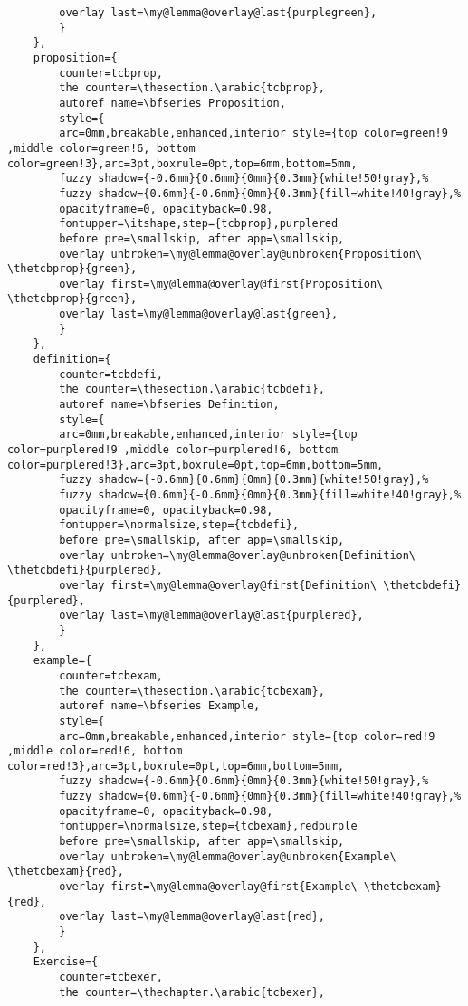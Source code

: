 \documentclass[lang=en,12pt]{beautybook}
\begin{document}
\begin{lstlisting}
        overlay last=\my@lemma@overlay@last{purplegreen},
        }
    },
    proposition={
        counter=tcbprop,
        the counter=\thesection.\arabic{tcbprop},
        autoref name=\bfseries Proposition,
        style={
        arc=0mm,breakable,enhanced,interior style={top color=green!9 ,middle color=green!6, bottom color=green!3},arc=3pt,boxrule=0pt,top=6mm,bottom=5mm,
        fuzzy shadow={-0.6mm}{0.6mm}{0mm}{0.3mm}{white!50!gray},% 
        fuzzy shadow={0.6mm}{-0.6mm}{0mm}{0.3mm}{fill=white!40!gray},%
        opacityframe=0, opacityback=0.98,
        fontupper=\itshape,step={tcbprop},purplered
        before pre=\smallskip, after app=\smallskip,
        overlay unbroken=\my@lemma@overlay@unbroken{Proposition\ \thetcbprop}{green},
        overlay first=\my@lemma@overlay@first{Proposition\ \thetcbprop}{green},
        overlay last=\my@lemma@overlay@last{green},
        }
    },
    definition={
        counter=tcbdefi,
        the counter=\thesection.\arabic{tcbdefi},
        autoref name=\bfseries Definition,
        style={
        arc=0mm,breakable,enhanced,interior style={top color=purplered!9 ,middle color=purplered!6, bottom color=purplered!3},arc=3pt,boxrule=0pt,top=6mm,bottom=5mm,
        fuzzy shadow={-0.6mm}{0.6mm}{0mm}{0.3mm}{white!50!gray},% 
        fuzzy shadow={0.6mm}{-0.6mm}{0mm}{0.3mm}{fill=white!40!gray},%
        opacityframe=0, opacityback=0.98,
        fontupper=\normalsize,step={tcbdefi},
        before pre=\smallskip, after app=\smallskip,
        overlay unbroken=\my@lemma@overlay@unbroken{Definition\ \thetcbdefi}{purplered},
        overlay first=\my@lemma@overlay@first{Definition\ \thetcbdefi}{purplered},
        overlay last=\my@lemma@overlay@last{purplered},
        }
    },
    example={
        counter=tcbexam,
        the counter=\thesection.\arabic{tcbexam},
        autoref name=\bfseries Example,
        style={
        arc=0mm,breakable,enhanced,interior style={top color=red!9 ,middle color=red!6, bottom color=red!3},arc=3pt,boxrule=0pt,top=6mm,bottom=5mm,
        fuzzy shadow={-0.6mm}{0.6mm}{0mm}{0.3mm}{white!50!gray},% 
        fuzzy shadow={0.6mm}{-0.6mm}{0mm}{0.3mm}{fill=white!40!gray},%
        opacityframe=0, opacityback=0.98,
        fontupper=\normalsize,step={tcbexam},redpurple
        before pre=\smallskip, after app=\smallskip,
        overlay unbroken=\my@lemma@overlay@unbroken{Example\ \thetcbexam}{red},
        overlay first=\my@lemma@overlay@first{Example\ \thetcbexam}{red},
        overlay last=\my@lemma@overlay@last{red},
        }
    },
    Exercise={
        counter=tcbexer,
        the counter=\thechapter.\arabic{tcbexer},

\end{lstlisting}
\end{document}
